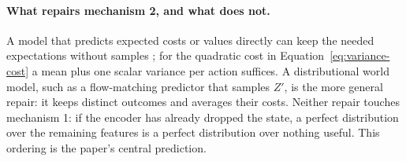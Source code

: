 \paragraph{What repairs mechanism 2, and what does not.}
A model that predicts expected costs or values directly can keep the needed expectations without
samples \citep{wan2019expectation,grimm2021proper}; for the quadratic cost in
Equation~\ref{eq:variance-cost} a mean plus one scalar variance per action suffices. A
distributional world model, such as a flow-matching predictor that samples $Z'$, is the more general
repair: it keeps distinct outcomes and averages their costs. Neither repair touches mechanism 1: if
the encoder has already dropped the state, a perfect distribution over the remaining features is a
perfect distribution over nothing useful. This ordering is the paper's central prediction.
